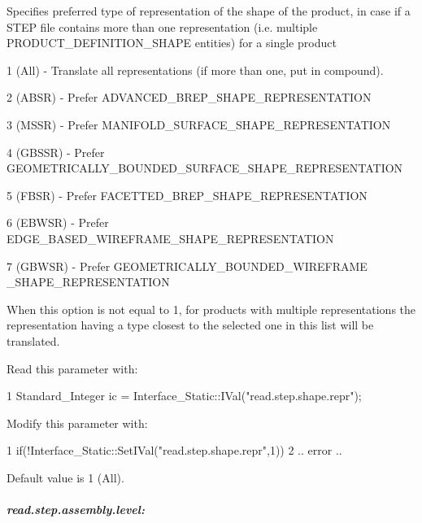 Specifies preferred type of representation of the shape of the product, in case if a S\+T\+EP file contains more than one representation (i.\+e. multiple P\+R\+O\+D\+U\+C\+T\+\_\+\+D\+E\+F\+I\+N\+I\+T\+I\+O\+N\+\_\+\+S\+H\+A\+PE entities) for a single product
\begin{DoxyItemize}
\item 1 (All) -\/ Translate all representations (if more than one, put in compound).
\item 2 (A\+B\+SR) -\/ Prefer A\+D\+V\+A\+N\+C\+E\+D\+\_\+\+B\+R\+E\+P\+\_\+\+S\+H\+A\+P\+E\+\_\+\+R\+E\+P\+R\+E\+S\+E\+N\+T\+A\+T\+I\+ON
\item 3 (M\+S\+SR) -\/ Prefer M\+A\+N\+I\+F\+O\+L\+D\+\_\+\+S\+U\+R\+F\+A\+C\+E\+\_\+\+S\+H\+A\+P\+E\+\_\+\+R\+E\+P\+R\+E\+S\+E\+N\+T\+A\+T\+I\+ON
\item 4 (G\+B\+S\+SR) -\/ Prefer G\+E\+O\+M\+E\+T\+R\+I\+C\+A\+L\+L\+Y\+\_\+\+B\+O\+U\+N\+D\+E\+D\+\_\+\+S\+U\+R\+F\+A\+C\+E\+\_\+\+S\+H\+A\+P\+E\+\_\+\+R\+E\+P\+R\+E\+S\+E\+N\+T\+A\+T\+I\+ON
\item 5 (F\+B\+SR) -\/ Prefer F\+A\+C\+E\+T\+T\+E\+D\+\_\+\+B\+R\+E\+P\+\_\+\+S\+H\+A\+P\+E\+\_\+\+R\+E\+P\+R\+E\+S\+E\+N\+T\+A\+T\+I\+ON
\item 6 (E\+B\+W\+SR) -\/ Prefer E\+D\+G\+E\+\_\+\+B\+A\+S\+E\+D\+\_\+\+W\+I\+R\+E\+F\+R\+A\+M\+E\+\_\+\+S\+H\+A\+P\+E\+\_\+\+R\+E\+P\+R\+E\+S\+E\+N\+T\+A\+T\+I\+ON
\item 7 (G\+B\+W\+SR) -\/ Prefer G\+E\+O\+M\+E\+T\+R\+I\+C\+A\+L\+L\+Y\+\_\+\+B\+O\+U\+N\+D\+E\+D\+\_\+\+W\+I\+R\+E\+F\+R\+A\+ME \+\_\+\+S\+H\+A\+P\+E\+\_\+\+R\+E\+P\+R\+E\+S\+E\+N\+T\+A\+T\+I\+ON
\end{DoxyItemize}

When this option is not equal to 1, for products with multiple representations the representation having a type closest to the selected one in this list will be translated.

Read this parameter with\+: 
\begin{DoxyCode}
1 Standard\_Integer ic = Interface\_Static::IVal("read.step.shape.repr");  
\end{DoxyCode}
 Modify this parameter with\+: 
\begin{DoxyCode}
1 if(!Interface\_Static::SetIVal("read.step.shape.repr",1))  
2 .. error .. 
\end{DoxyCode}
 Default value is 1 (All).

\subparagraph*{read.\+step.\+assembly.\+level\+:}

